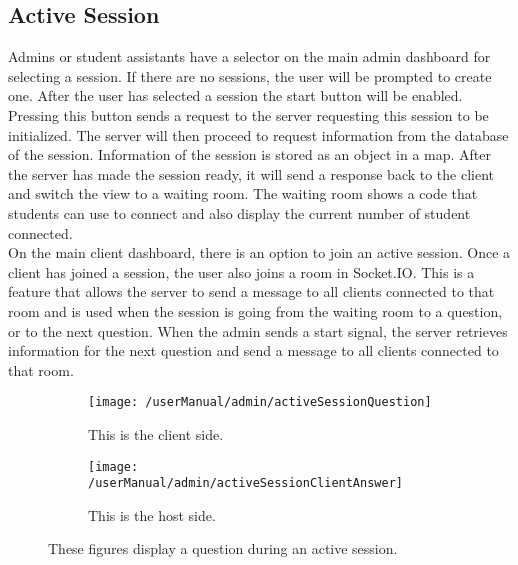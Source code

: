 \subsection{Active Session}
Admins or student assistants have a selector on the main admin dashboard for selecting a session. If there are no sessions, the user will be prompted to create one. After the user has selected a session the start button will be enabled. Pressing this button sends a request to the server requesting this session to be initialized. The server will then proceed to request information from the database of the session. Information of the session is stored as an object in a map. After the server has made the session ready, it will send a response back to the client and switch the view to a waiting room. The waiting room shows a code that students can use to connect and also display the current number of student connected. 
\\[11pt]
On the main client dashboard, there is an option to join an active session. Once a client has joined a session, the user also joins a room in Socket.IO. This is a feature that allows the server to send a message to all clients connected to that room and is used when the session is going from the waiting room to a question, or to the next question. When the admin sends a start signal, the server retrieves information for the next question and send a message to all clients connected to that room.

\begin{figure}[H]
	\centering
	\begin{subfigure}{\linewidth}
		\centering
		\texttt{[image: /userManual/admin/activeSessionQuestion]}
		\caption{This is the client side.}
		\label{fig:activeSessionAdmin}
	\end{subfigure}
	\begin{subfigure}{\linewidth}
		\centering
		\texttt{[image: /userManual/admin/activeSessionClientAnswer]}
		\caption{This is the host side.}
		\label{fig:activeSessionClient}
	\end{subfigure}
	\label{fig:activeSession}
	\caption{These figures display a question during an active session.}
\end{figure}

